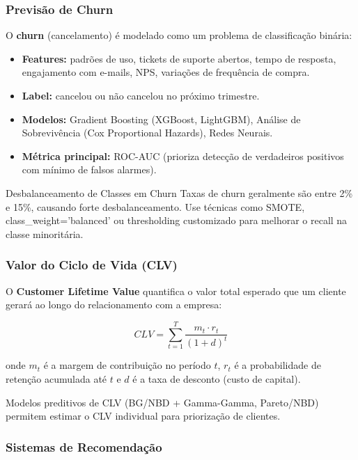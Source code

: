 \documentclass[12pt,a4paper]{article}
\begin{document}
\subsubsection{Previsão de Churn}

O \textbf{churn} (cancelamento) é modelado como um problema de classificação binária:
\begin{itemize}
  \item \textbf{Features:} padrões de uso, tickets de suporte abertos, tempo de resposta, engajamento com e-mails, NPS, variações de frequência de compra.
  \item \textbf{Label:} cancelou ou não cancelou no próximo trimestre.
  \item \textbf{Modelos:} Gradient Boosting (XGBoost, LightGBM), Análise de Sobrevivência (Cox Proportional Hazards), Redes Neurais.
  \item \textbf{Métrica principal:} ROC-AUC (prioriza detecção de verdadeiros positivos com mínimo de falsos alarmes).
\end{itemize}

\begin{atencaobox}{Desbalanceamento de Classes em Churn}
Taxas de churn geralmente são entre 2\% e 15\%, causando forte desbalanceamento. Use técnicas como SMOTE, class\_weight='balanced' ou thresholding customizado para melhorar o recall na classe minoritária.
\end{atencaobox}

\subsubsection{Valor do Ciclo de Vida (CLV)}

O \textbf{Customer Lifetime Value} quantifica o valor total esperado que um cliente gerará ao longo do relacionamento com a empresa:

\begin{equation}
  CLV = \sum_{t=1}^{T} \frac{m_t \cdot r_t}{(1+d)^t}
\end{equation}

onde $m_t$ é a margem de contribuição no período $t$, $r_t$ é a probabilidade de retenção acumulada até $t$ e $d$ é a taxa de desconto (custo de capital).

Modelos preditivos de CLV (BG/NBD + Gamma-Gamma, Pareto/NBD) permitem estimar o CLV individual para priorização de clientes.

\subsubsection{Sistemas de Recomendação}
\end{document}
